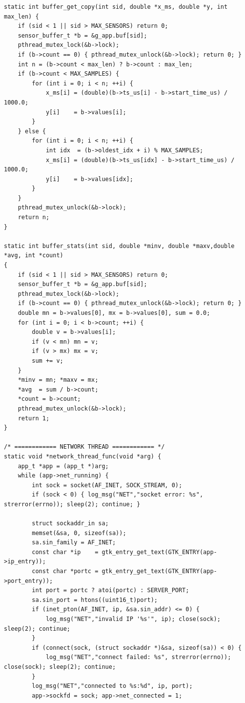 \begin{verbatim}
static int buffer_get_copy(int sid, double *x_ms, double *y, int max_len) {
    if (sid < 1 || sid > MAX_SENSORS) return 0;
    sensor_buffer_t *b = &g_app.buf[sid];
    pthread_mutex_lock(&b->lock);
    if (b->count == 0) { pthread_mutex_unlock(&b->lock); return 0; }
    int n = (b->count < max_len) ? b->count : max_len;
    if (b->count < MAX_SAMPLES) {
        for (int i = 0; i < n; ++i) {
            x_ms[i] = (double)(b->ts_us[i] - b->start_time_us) / 1000.0;
            y[i]    = b->values[i];
        }
    } else {
        for (int i = 0; i < n; ++i) {
            int idx  = (b->oldest_idx + i) % MAX_SAMPLES;
            x_ms[i] = (double)(b->ts_us[idx] - b->start_time_us) / 1000.0;
            y[i]    = b->values[idx];
        }
    }
    pthread_mutex_unlock(&b->lock);
    return n;
}

static int buffer_stats(int sid, double *minv, double *maxv,double *avg, int *count) 
{
    if (sid < 1 || sid > MAX_SENSORS) return 0;
    sensor_buffer_t *b = &g_app.buf[sid];
    pthread_mutex_lock(&b->lock);
    if (b->count == 0) { pthread_mutex_unlock(&b->lock); return 0; }
    double mn = b->values[0], mx = b->values[0], sum = 0.0;
    for (int i = 0; i < b->count; ++i) {
        double v = b->values[i];
        if (v < mn) mn = v;
        if (v > mx) mx = v;
        sum += v;
    }
    *minv = mn; *maxv = mx;
    *avg  = sum / b->count;
    *count = b->count;
    pthread_mutex_unlock(&b->lock);
    return 1;
}

/* ============ NETWORK THREAD ============ */
static void *network_thread_func(void *arg) {
    app_t *app = (app_t *)arg;
    while (app->net_running) {
        int sock = socket(AF_INET, SOCK_STREAM, 0);
        if (sock < 0) { log_msg("NET","socket error: %s", strerror(errno)); sleep(2); continue; }

        struct sockaddr_in sa;
        memset(&sa, 0, sizeof(sa));
        sa.sin_family = AF_INET;
        const char *ip    = gtk_entry_get_text(GTK_ENTRY(app->ip_entry));
        const char *portc = gtk_entry_get_text(GTK_ENTRY(app->port_entry));
        int port = portc ? atoi(portc) : SERVER_PORT;
        sa.sin_port = htons((uint16_t)port);
        if (inet_pton(AF_INET, ip, &sa.sin_addr) <= 0) {
            log_msg("NET","invalid IP '%s'", ip); close(sock); sleep(2); continue;
        }
        if (connect(sock, (struct sockaddr *)&sa, sizeof(sa)) < 0) {
            log_msg("NET","connect failed: %s", strerror(errno)); close(sock); sleep(2); continue;
        }
        log_msg("NET","connected to %s:%d", ip, port);
        app->sockfd = sock; app->net_connected = 1;


\end{verbatim}
